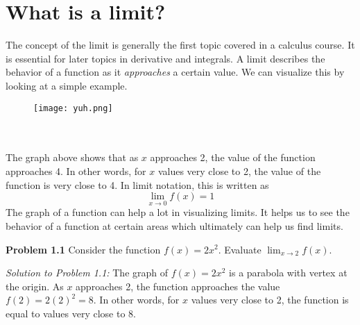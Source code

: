 \documentclass[11pt]{scrartcl}
\begin{document}
\maketitle
\noindent

\section{What is a limit?}
\noindent
The concept of the limit is generally the first topic covered in a calculus course. It is essential for later topics in derivative and integrals. A limit describes the behavior of a function as it \textit{approaches} a certain value. We can visualize this by looking at a simple example. 
\begin{figure}[htp]
    \centering
    \texttt{[image: yuh.png]}
\end{figure} \\
\\
\noindent 
The graph above shows that as $x$ approaches 2, the value of the function approaches 4. In other words, for $x$ values very close to 2, the value of the function is very close to 4. In limit notation, this is written as 
$$\lim_{x \to 0} f(x)=1$$ 
\noindent 
The graph of a function can help a lot in visualizing limits. It helps us to see the behavior of a function at certain areas which ultimately can help us find limits. \\


\begin{tcolorbox}
[colback=purple!5!white,colframe=purple!75!black]
\textbf{Problem 1.1} Consider the function $f(x)=2x^2$. Evaluate $\lim_{x \to 2} f(x)$.
\end{tcolorbox}
\noindent
\textit{Solution to Problem 1.1:} The graph of $f(x)=2x^2$ is a parabola with vertex at the origin. As $x$ approaches 2, the function approaches the value $f(2)=2(2)^2=8$. In other words, for $x$ values very close to 2, the function is equal to values very close to 8. \\
\end{document}
